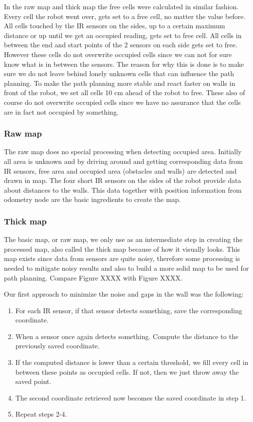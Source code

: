 In the raw map and thick map the free cells were calculated in similar fashion. Every cell the robot went over, gets set to a free cell, no matter the value before. All cells touched by the IR sensors on the sides, up to a certain maximum distance or up until we get an occupied reading, gets set to free cell. All cells in between the end and start points of the 2 sensors on each side gets set to free. However these cells do not overwrite occupied cells since we can not for sure know what is in between the sensors. The reason for why this is done is to make sure we do not leave behind lonely unknown cells that can influence the path planning. To make the path planning more stable and react faster on walls in front of the robot, we set all cells 10 cm ahead of the robot to free. These also of course do not overwrite occupied cells since we have no assurance that the cells are in fact not occupied by something. 

\subsubsection{Raw map}
The raw map does no special processing when detecting occupied area. Initially all area is unknown and by driving around and getting corresponding data from IR sensors, free area and occupied area (obstacles and walls) are detected and drawn in map. The four short IR sensors on the sides of the robot provide data about distances to the walls. This data together with position information from odometry node are the basic ingredients to create the map.

\subsubsection{Thick map}
The basic map, or raw map, we only use as an intermediate step in creating the processed map, also called the thick map because of how it visually looks. This map exists since data from sensors are quite noisy, therefore some processing is needed to mitigate noisy results and also to build a more solid map to be used for path planning. Compare Figure XXXX with Figure XXXX.

Our first approach to minimize the noise and gaps in the wall was the following:

\begin{enumerate}
\item For each IR sensor, if that sensor detects something, save the corresponding coordinate.
\item When a sensor once again detects something. Compute the distance to the previously saved coordinate.
\item If the computed distance is lower than a certain threshold, we fill every cell in between these points as occupied cells. If not, then we just throw away the saved point.
\item The second coordinate retrieved now becomes the saved coordinate in step 1.
\item Repeat steps 2-4.
\end{enumerate}

